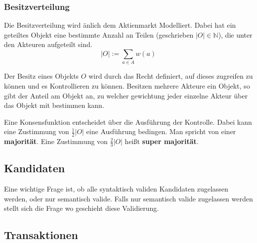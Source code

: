 \documentclass[]{article}
\begin{document}


\subsubsection{Besitzverteilung}


Die Besitzverteilung wird änlich dem Aktienmarkt Modelliert. Dabei hat ein geteiltes Objekt eine bestimmte Anzahl an Teilen (geschrieben $|O| \in \mathbb{N}$), die unter den Akteuren aufgeteilt sind. 
\[ |O| := \sum_{a \in A} w(a) \] 

Der Besitz eines Objekts $O$ wird durch das Recht definiert, auf dieses zugreifen zu können und es Kontrollieren zu können\cite{Waldron2004}. Besitzen mehrere Akteure ein Objekt, so gibt der Anteil am Objekt an, zu welcher gewichtung jeder einzelne Akteur über das Objekt mit bestimmen kann.

Eine Konsensfunktion entscheidet über die Ausführung der Kontrolle. Dabei kann eine Zustimmung von $\frac{1}{2}|O|$ eine Ausführung bedingen. Man spricht von einer \textbf{majorität}. Eine Zustimmung von $\frac{2}{3}|O|$ heißt \textbf{super majorität}.





% 


\subsection{Kandidaten}

Eine wichtige Frage ist, ob alle syntaktisch validen Kandidaten zugelassen werden, oder nur semantisch valide. Falls nur semantisch valide zugelassen werden stellt sich die Frage wo geschieht diese Validierung.

\subsection {Transaktionen}
\end{document}

